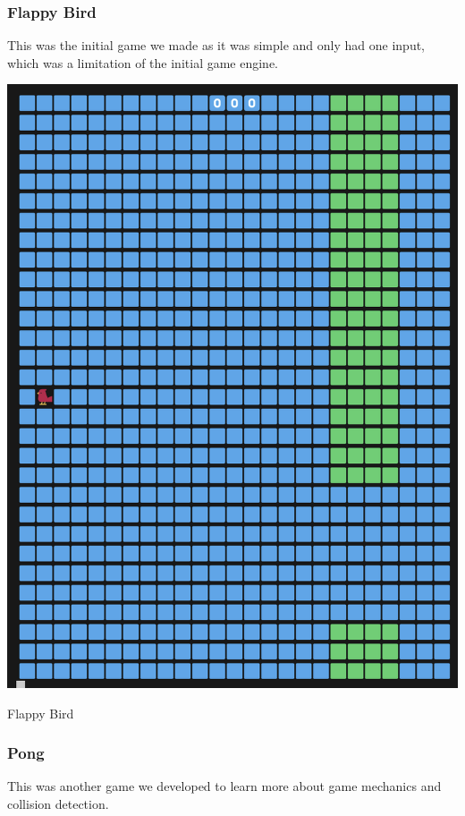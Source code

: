 \documentclass{article}
\begin{document}
\begin{multicols}{2}

\subsubsection{Flappy Bird}
This was the initial game we made as it was simple and only had one input, which was a limitation of the initial game engine.\\

\begin{minipage}{\linewidth}
    \centering
    \includegraphics[width=0.8\linewidth]{flappybird.png}
    \captionsetup{type=figure}
    \caption{Flappy Bird}
    \label{fig:game-engine-example}
\end{minipage}

\subsubsection{Pong}
This was another game we developed to learn more about game mechanics and collision detection.\\


\end{multicols}
\end{document}
